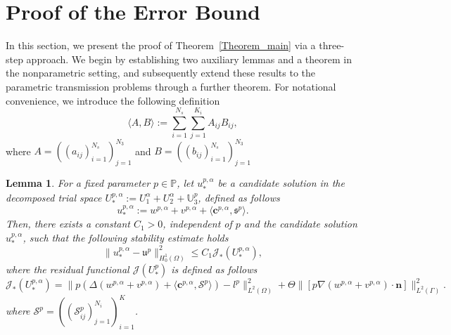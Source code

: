 \documentclass[oneside]{article}
\newtheorem{lemma}[theorem]{Lemma}
\begin{document}
\section{Proof of the Error Bound}\label{Proof of the Error Bound}
\noindent In this section, we present the proof of Theorem~\eqref{Theorem_main} via a three-step approach. 
We begin by establishing two auxiliary lemmas and a theorem in the nonparametric setting, and subsequently extend these results to the parametric transmission problems through a further theorem. 
For notational convenience, we introduce the following definition
\[
\langle A, B \rangle := \sum_{i=1}^{N_s} \sum_{j = 1}^{K_i} A_{ij} B_{ij},
\]
where $A = \left(\left(a_{ij}\right)_{i=1}^{N_s}\right)_{j=1}^{N_3}$ and $B = \left(\left(b_{ij}\right)_{i=1}^{N_s}\right)_{j=1}^{N_3}$


\begin{lemma}\label{Lemma_2_1}
For a fixed parameter $p \in \mathbb{P}$, let $u^{p, \alpha}_*$ be a candidate solution in the decomposed trial space $U_*^{p, \alpha} := U^\alpha_1 + U^\alpha_2 + \mathbb{U}_3^p$, defined as follows
\begin{equation}
u^{p, \alpha}_* := w^{p, \alpha} + v^{p, \alpha} + \langle \mathbf{c}^{p, \alpha}, \mathfrak{s}^p \rangle.
\end{equation}
Then, there exists a constant $C_1 > 0$,  independent of $p$ and the candidate solution $u^{p, \alpha}_*$, such that the following stability estimate holds
\begin{equation}\label{eq2_upper_bound_H01}
\| u_*^{p, \alpha} - \mathfrak{u}^p \|_{H_0^1(\Omega)}^2 \leq C_1 {\mathcal{J}}_*(U_*^{p, \alpha}),
\end{equation}
where the residual functional ${\mathcal{J}}(U_*^p)$ is defined as follows
\begin{equation}
{\mathcal{J}}_*(U_*^{p, \alpha}) = \| p \left( \Delta (w^{p, \alpha} + v^{p, \alpha}) + \langle \mathbf{c}^{p, \alpha}, \mathcal{S}^p \rangle \right) - l^p \|^2_{L^2(\Omega)} + \Theta \| \left[ p \nabla (w^{p, \alpha} + v^{p, \alpha}) \cdot \mathbf{n} \right] \|_{L^2(\Gamma)}^2.
\end{equation}
where \( \mathcal{S}^p = \left( \left( \mathcal{S}_{ij}^p \right)_{j=1}^{N_i} \right)_{i=1}^K \).
\end{lemma}
\end{document}
